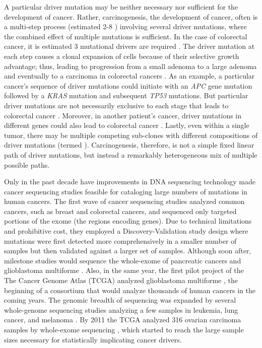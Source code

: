 A particular driver mutation may be neither necessary nor sufficient for the development of cancer. Rather, carcinogenesis, the development of cancer, often is a multi-step process (estimated 2-8 \cite{RN25}) involving several driver mutations, where the combined effect of multiple mutations is sufficient. In the case of colorectal cancer, it is estimated 3 mutational drivers are required \cite{RN27}. The driver mutation at each step causes a clonal expansion of cells because of their selective growth advantage; thus, leading to progression from a small adenoma to a large adenoma and eventually to a carcinoma in colorectal cancers \cite{RN26}. As an example, a particular cancer's sequence of driver mutations could initiate with an \textit{APC} gene mutation followed by a \textit{KRAS} mutation and subsequent \textit{TP53} mutations. But particular driver mutations are not necessarily exclusive to each stage that leads to colorectal cancer \cite{RN26}. Moreover, in another patient's cancer, driver mutations in different genes could also lead to colorectal cancer \cite{RN48}. Lastly, even within a single tumor, there may be multiple competing sub-clones with different compositions of driver mutations (termed ).  Carcinogenesis, therefore, is not a simple fixed linear path of driver mutations, but instead a remarkably heterogeneous mix of multiple possible paths. 

Only in the past decade have improvements in DNA sequencing technology made cancer sequencing studies feasible for cataloging large numbers of mutations in human cancers. The first wave of cancer sequencing studies \cite{RN2, RN4, RN3} analyzed common cancers, such as breast and colorectal cancers, and sequenced only targeted portions of the exome (the regions encoding genes). Due to technical limitations and prohibitive cost, they employed a Discovery-Validation study design where mutations were first detected more comprehensively in a smaller number of samples but then validated against a larger set of samples. Although soon after, milestone studies would sequence the whole-exome of pancreatic cancers \cite{RN5} and glioblastoma multiforme \cite{RN6}.  Also, in the same year, the first pilot project of the The Cancer Genome Atlas (TCGA) analyzed glioblastoma multiforme \cite{RN7}, the beginning of a consortium that would analyze thousands of human cancers in the coming years. The genomic breadth of sequencing was expanded by several whole-genome sequencing studies analyzing a few samples in leukemia, lung cancer, and melanoma \cite{RN8, RN9, RN10}. By 2011 the TCGA analyzed 316 ovarian carcinoma samples by whole-exome sequencing \cite{RN11}, which started to reach the large sample sizes necessary for statistically implicating cancer drivers.

